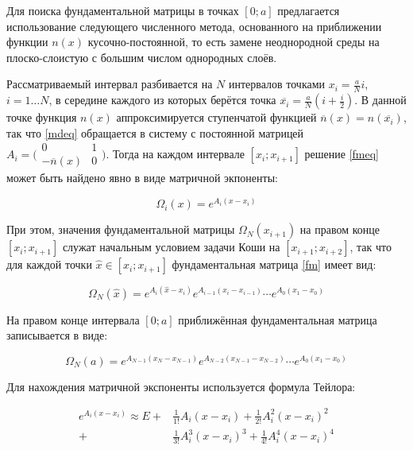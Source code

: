 \documentclass{article}
\numberwithin{equation}{section}
\begin{document}
Для поиска фундаментальной матрицы в точках $[0; a]$ предлагается
использование следующего численного метода, основанного на приближении
функции $n(x)$ кусочно-постоянной, то есть замене неоднородной среды
на плоско-слоистую с большим числом однородных слоёв.

Рассматриваемый интервал разбивается на $N$ интервалов точками
$x_i = \frac{a}{N}i$, $i = 1 \ldots N$, в середине каждого из
которых берётся точка $\overline{x_i} = \frac{a}{N}(i+\frac{i}{2})$. В
данной точке функция $n(x)$ аппроксимируется ступенчатой функцией
$\overline{n}(x) = n(\overline{x_i})$, так что \eqref{mdeq} обращается
в систему с постоянной матрицей $A_i = \bigl(
\begin{smallmatrix}0& 1 \\ -\overline{n}(x)& 0 \end{smallmatrix}
\bigr)$. Тогда на каждом интервале $[x_i; x_{i+1}]$ решение
\eqref{fmeq} может быть найдено явно в виде матричной экпоненты:

\[
\Omega_i(x) = e^{A_i (x - x_i)}
\]

При этом, значения фундаментальной матрицы $\Omega_N(x_{i+1})$ на
правом конце $[x_i; x_{i+1}]$ служат начальным условием задачи Коши на
$[x_{i+1}; x_{i+2}]$, так что для каждой точки $\hat{x} \in [x_i;
x_{i+1}]$ фундаментальная матрица \eqref{fm} имеет вид:

\begin{equation}\label{fmx}
  \Omega_N(\hat{x}) = e^{A_i(\hat{x}-x_i)} e^{A_{i-1}(x_i-x_{i-1})} \dotsm e^{A_0(x_1-x_0)}
\end{equation}

На правом конце интервала $[0; a]$ приближённая фундаментальная
матрица записывается в виде:

\begin{equation}\label{fma}
  \Omega_N(a) = e^{A_{N-1}(x_N-x_{N-1})} e^{A_{N-2}(x_{N-1}-x_{N-2})} \dotsm e^{A_0(x_1-x_0)}
\end{equation}

Для нахождения матричной экспоненты используется формула Тейлора:

\begin{equation}\label{matrix-exp}
\begin{split}
  e^{A_i(x-x_i)} \approx E +& \frac{1}{1!}{A_i(x-x_i)} +
  \frac{1}{2!}{A_i^2(x-x_i)^2}\\
  +& \frac{1}{3!}{A_i^3(x-x_i)^3} + \frac{1}{4!}{A_i^4(x-x_i)^4}
\end{split}
\end{equation}
\end{document}

